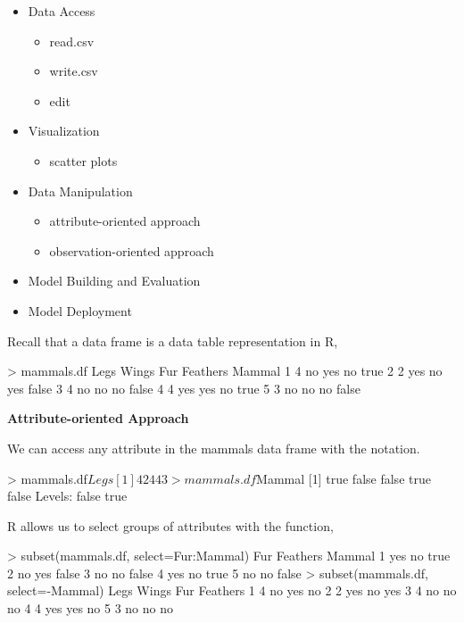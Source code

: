 \documentclass[a4paper,blends,pdf,colorBG,slideColor]{prosper}
\begin{document}
\begin{itemize}
\item Data Access 
	\begin{itemize}
	\item read.csv
	\item write.csv
	\item edit
	\end{itemize}
\item Visualization 
	\begin{itemize}
	\item scatter plots
	\end{itemize}
\item Data Manipulation
	\begin{itemize}
	\item attribute-oriented approach
	\item observation-oriented approach
	\end{itemize}
\item Model Building and Evaluation
\item Model Deployment
\end{itemize}
\es


Recall that a data frame is a data table
representation in R,
\begin{Rcode}
> mammals.df
  Legs Wings  Fur Feathers Mammal
1    4    no  yes       no   true
2    2   yes   no      yes  false
3    4    no   no       no  false
4    4   yes  yes       no   true
5    3    no   no       no  false
\end{Rcode}
\es

{\bf Attribute-oriented Approach}

We can access any attribute in the mammals data frame with the \mytt{\$} notation.
\begin{Rcode}
> mammals.df$Legs
[1] 4 2 4 4 3
> mammals.df$Mammal
[1]  true   false  false  true   false
Levels:  false  true
\end{Rcode}

R allows us to select groups of attributes with the  function,
\begin{Rcode}
> subset(mammals.df, select=Fur:Mammal)
   Fur Feathers Mammal
1  yes       no   true
2   no      yes  false
3   no       no  false
4  yes       no   true
5   no       no  false
> subset(mammals.df, select=-Mammal)
  Legs Wings  Fur Feathers
1    4    no  yes       no
2    2   yes   no      yes
3    4    no   no       no
4    4   yes  yes       no
5    3    no   no       no
\end{Rcode}
\es
\end{document}
